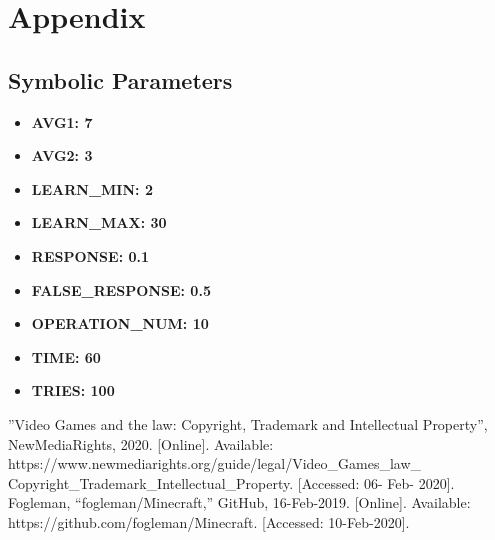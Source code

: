 \documentclass[12pt, titlepage]{article}
\begin{document}
\section{Appendix}

\subsection{Symbolic Parameters}

\begin{itemize}
    \item \textbf{AVG1: 7}
    \item \textbf{AVG2: 3}
    \item \textbf{LEARN\_MIN: 2}
    \item \textbf{LEARN\_MAX: 30}
    \item \textbf{RESPONSE: 0.1}
    \item \textbf{FALSE\_RESPONSE: 0.5}
    \item \textbf{OPERATION\_NUM: 10}
    \item \textbf{TIME: 60}
    \item \textbf{TRIES: 100}
\end{itemize}
\newpage
\begin{thebibliography}{9}
”Video Games and the law: Copyright, 
        Trademark and Intellectual Property”, NewMediaRights, 2020. [Online]. 
        Available: https://www.newmediarights.org/guide/legal/Video\_Games\_law\_
        Copyright\_Trademark\_Intellectual\_Property. [Accessed: 06- Feb- 
        2020].
Fogleman, “fogleman/Minecraft,” 
        GitHub, 16-Feb-2019. [Online]. Available: 
        https://github.com/fogleman/Minecraft. [Accessed: 
        10-Feb-2020].

\end{thebibliography}
\end{document}
